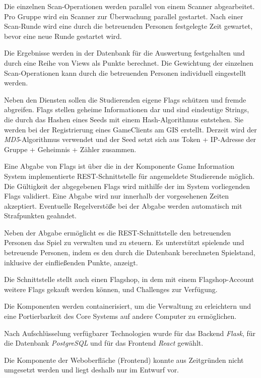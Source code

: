 Die einzelnen Scan-Operationen werden parallel von einem Scanner abgearbeitet. Pro Gruppe wird ein Scanner zur Überwachung parallel gestartet. Nach einer Scan-Runde wird eine durch die betreuenden Personen festgelegte Zeit gewartet, bevor eine neue Runde gestartet wird.

Die Ergebnisse werden in der Datenbank für die Auswertung festgehalten und durch eine Reihe von Views als Punkte berechnet. Die Gewichtung der einzelnen Scan-Operationen kann durch die betreuenden Personen individuell eingestellt werden.

Neben den Diensten sollen die Studierenden eigene Flags schützen und fremde abgreifen.
Flags stellen geheime Informationen dar und sind eindeutige Strings, die durch das Hashen eines Seeds mit einem Hash-Algorithmus entstehen. Sie werden bei der Registrierung eines GameClients am GIS erstellt.
Derzeit wird der \textit{MD5}-Algorithmus verwendet und der Seed setzt sich aus Token + IP-Adresse der Gruppe + Geheimnis + Zähler zusammen.

Eine Abgabe von Flags ist über die in der Komponente Game Information System implementierte REST-Schnittstelle für angemeldete Studierende möglich. Die Gültigkeit der abgegebenen Flags wird mithilfe der im System vorliegenden Flags validiert. Eine Abgabe wird nur innerhalb der vorgesehenen Zeiten akzeptiert. Eventuelle Regelverstöße bei der Abgabe werden automatisch mit Strafpunkten geahndet.

Neben der Abgabe ermöglicht es die REST-Schnittstelle den betreuenden Personen das Spiel zu verwalten und zu steuern. Es unterstützt spielende und betreuende Personen, indem es den durch die Datenbank berechneten Spielstand, inklusive der einfließenden Punkte, anzeigt.

Die Schnittstelle stellt auch einen Flagshop, in dem mit einem Flagshop-Account weitere Flags gekauft werden können, und Challenges zur Verfügung.

Die Komponenten werden containerisiert, um die Verwaltung zu erleichtern und eine Portierbarkeit des Core Systems auf andere Computer zu ermöglichen.

Nach Aufschlüsselung verfügbarer Technologien wurde für das Backend \textit{Flask}, für die Datenbank \textit{PostgreSQL} und für das Frontend \textit{React} gewählt.

Die Komponente der Weboberfläche (Frontend) konnte aus Zeitgründen nicht umgesetzt werden und liegt deshalb nur im Entwurf vor.




